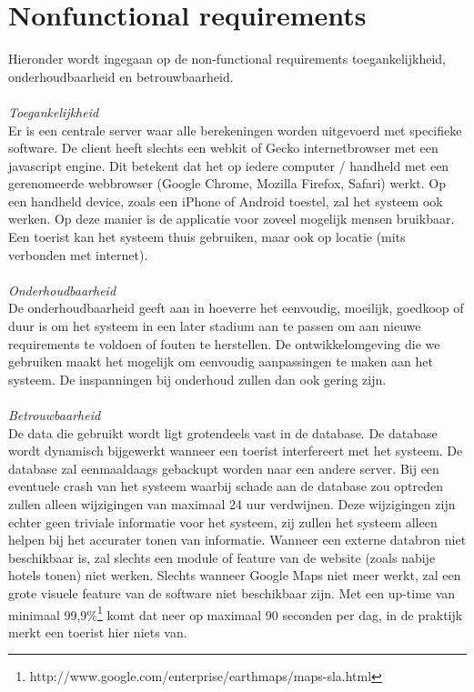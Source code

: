 \documentclass[a4paper,10pt]{article}
\begin{document}
		\section{Nonfunctional requirements}
			Hieronder wordt ingegaan op de non-functional requirements toegankelijkheid, onderhoudbaarheid en betrouwbaarheid.\\	\\
			\textit{Toegankelijkheid}\\
			Er is een centrale server waar alle berekeningen worden uitgevoerd met specifieke software. De client heeft slechts een webkit of Gecko internetbrowser met een javascript engine. Dit betekent dat het op iedere computer / handheld met een gerenomeerde webbrowser (Google Chrome, Mozilla Firefox, Safari) werkt. Op een handheld device, zoals een iPhone of Android toestel, zal het systeem ook werken. Op deze manier is de applicatie voor zoveel mogelijk mensen bruikbaar. Een toerist kan het systeem thuis gebruiken, maar ook op locatie (mits verbonden met internet).\\ \\
			\textit{Onderhoudbaarheid}\\
			De onderhoudbaarheid geeft aan in hoeverre het eenvoudig, moeilijk, goedkoop of duur is om het systeem in een later stadium aan te passen om aan nieuwe requirements te voldoen of fouten te herstellen. De ontwikkelomgeving die we gebruiken maakt het mogelijk om eenvoudig aanpassingen te maken aan het systeem. De inspanningen bij onderhoud zullen dan ook gering zijn.\\ \\
			\textit{Betrouwbaarheid}\\
			De data die gebruikt wordt ligt grotendeels vast in de database. De database wordt dynamisch bijgewerkt wanneer een toerist interfereert met het systeem. De database zal eenmaaldaags gebackupt worden naar een andere server. Bij een eventuele crash van het systeem waarbij schade aan de database zou optreden zullen alleen wijzigingen van maximaal 24 uur verdwijnen. Deze wijzigingen zijn echter geen triviale informatie voor het systeem, zij zullen het systeem alleen helpen bij het accurater tonen van informatie. Wanneer een externe databron niet beschikbaar is, zal slechts een module of feature van de website (zoals nabije hotels tonen) niet werken. Slechts wanneer Google Maps niet meer werkt, zal een grote visuele feature van de software niet beschikbaar zijn. Met een up-time van minimaal 99,9\%\footnote{http://www.google.com/enterprise/earthmaps/maps-sla.html} komt dat neer op maximaal 90 seconden per dag, in de praktijk merkt een toerist hier niets van.
			
\end{document}
